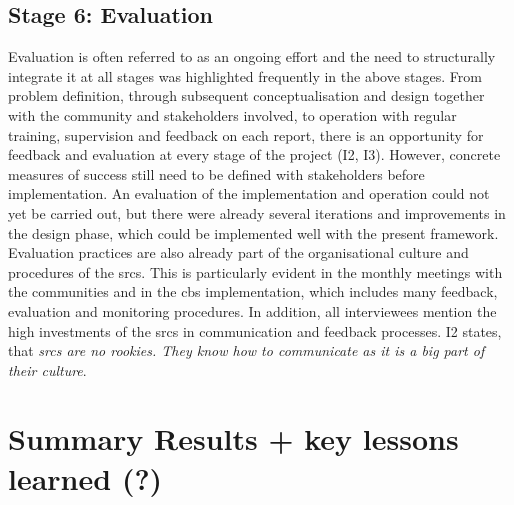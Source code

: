 \subsection{Stage 6: Evaluation}

Evaluation is often referred to as an ongoing effort and the need to structurally integrate it at all stages was highlighted frequently in the above stages. From problem definition, through subsequent conceptualisation and design together with the community and stakeholders involved, to operation with regular training, supervision and feedback on each report, there is an opportunity for feedback and evaluation at every stage of the project (I2, I3). However, concrete measures of success still need to be defined with stakeholders before implementation. An evaluation of the implementation and operation could not yet be carried out, but there were already several iterations and improvements in the design phase, which could be implemented well with the present framework.\newline
Evaluation practices are also already part of the organisational culture and procedures of the \acrshort{srcs}. This is particularly evident in the monthly meetings with the communities and in the \acrshort{cbs} implementation, which includes many feedback, evaluation and monitoring procedures. In addition, all interviewees mention the high investments of the \acrshort{srcs} in communication and feedback processes. I2 states, that \textit{\acrshort{srcs} are no rookies. They know how to communicate as it is a big part of their culture}.



\section{Summary Results + key lessons learned (?)}

